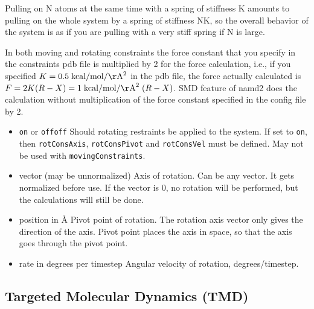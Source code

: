 Pulling on N atoms at the same time with a spring of stiffness K
   amounts to pulling on the whole system by a spring of stiffness NK,
   so the overall behavior of the system is as if you are pulling with a
   very stiff spring if N is large.

In both moving and rotating constraints the force constant that you
   specify in the constraints pdb file is multiplied by 2 for the force
   calculation, i.e., if you specified $K = 0.5 \; {\rm kcal}/{\rm mol}/{\rm \AA}^2$ in the pdb
file,
   the force actually calculated is $F = 2 K (R-X) = 1 \; {\rm kcal}/{\rm mol}/{\rm \AA}^2 \; (R-X)$.
   SMD feature of namd2 does the calculation without multiplication of
the
   force constant specified in the config file by 2.


\begin{itemize}

\item
{}
{{\tt on} or {\tt off}}{{\tt off}}
{Should rotating restraints be applied to the system. If set
to {\tt on}, then {\tt rotConsAxis}, {\tt rotConsPivot} and
{\tt rotConsVel} must be defined.
May not be used with {\tt movingConstraints}.}

\item
{}
{vector (may be unnormalized)}
{Axis of rotation. Can be any vector. It gets
normalized before use. If the vector is 0,
no rotation will be performed, but the calculations
will still be done.}

\item
{}
{position in \AA}
{Pivot point of rotation. The rotation axis vector
only gives the direction of the axis. Pivot point
places the axis in space, so that the axis goes
through the pivot point.}

\item
{}
{rate in degrees per timestep}
{Angular velocity of rotation, degrees/timestep.}

\end{itemize}

\subsection{Targeted Molecular Dynamics (TMD)}

